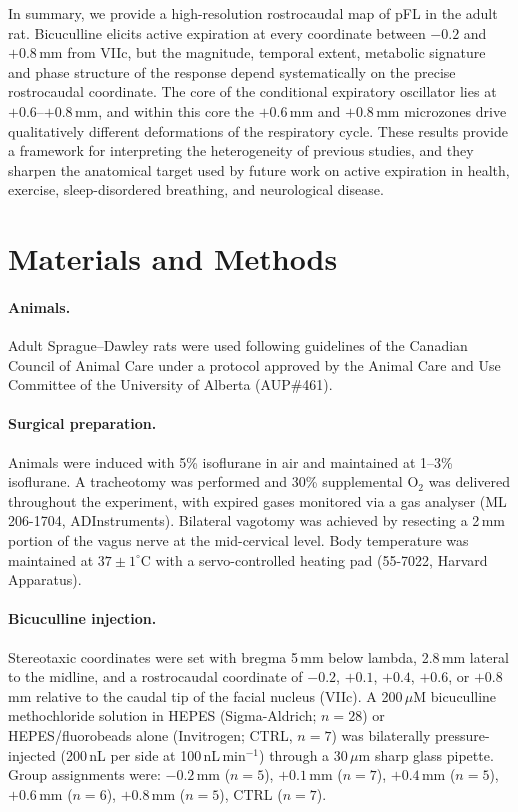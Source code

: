 \documentclass[11pt]{article}
\begin{document}
In summary, we provide a high-resolution rostrocaudal map of pFL in the
adult rat. Bicuculline elicits active expiration at every coordinate
between $-0.2$ and $+0.8$\,mm from VIIc, but the magnitude, temporal
extent, metabolic signature and phase structure of the response depend
systematically on the precise rostrocaudal coordinate. The core of the
conditional expiratory oscillator lies at $+0.6$--$+0.8$\,mm, and within
this core the $+0.6$\,mm and $+0.8$\,mm microzones drive qualitatively
different deformations of the respiratory cycle. These results provide a
framework for interpreting the heterogeneity of previous studies, and
they sharpen the anatomical target used by future work on active
expiration in health, exercise, sleep-disordered breathing, and
neurological disease.

\section{Materials and Methods}

\paragraph{Animals.}
Adult Sprague--Dawley rats were used following guidelines of the Canadian
Council of Animal Care under a protocol approved by the Animal Care and
Use Committee of the University of Alberta (AUP\#461).

\paragraph{Surgical preparation.}
Animals were induced with 5\% isoflurane in air and maintained at 1--3\%
isoflurane. A tracheotomy was performed and 30\% supplemental O$_2$ was
delivered throughout the experiment, with expired gases monitored via a
gas analyser (ML 206-1704, ADInstruments). Bilateral vagotomy was
achieved by resecting a 2\,mm portion of the vagus nerve at the
mid-cervical level. Body temperature was maintained at $37\pm1^\circ$C
with a servo-controlled heating pad (55-7022, Harvard Apparatus).

\paragraph{Bicuculline injection.}
Stereotaxic coordinates were set with bregma 5\,mm below lambda, 2.8\,mm
lateral to the midline, and a rostrocaudal coordinate of $-0.2$, $+0.1$,
$+0.4$, $+0.6$, or $+0.8$\,mm relative to the caudal tip of the facial
nucleus (VIIc). A 200\,$\mu$M bicuculline methochloride solution in
HEPES (Sigma-Aldrich; $n=28$) or HEPES/fluorobeads alone (Invitrogen;
CTRL, $n=7$) was bilaterally pressure-injected (200\,nL per side at
100\,nL\,min$^{-1}$) through a 30\,$\mu$m sharp glass pipette. Group
assignments were: $-0.2$\,mm ($n=5$), $+0.1$\,mm ($n=7$), $+0.4$\,mm
($n=5$), $+0.6$\,mm ($n=6$), $+0.8$\,mm ($n=5$), CTRL ($n=7$).
\end{document}
